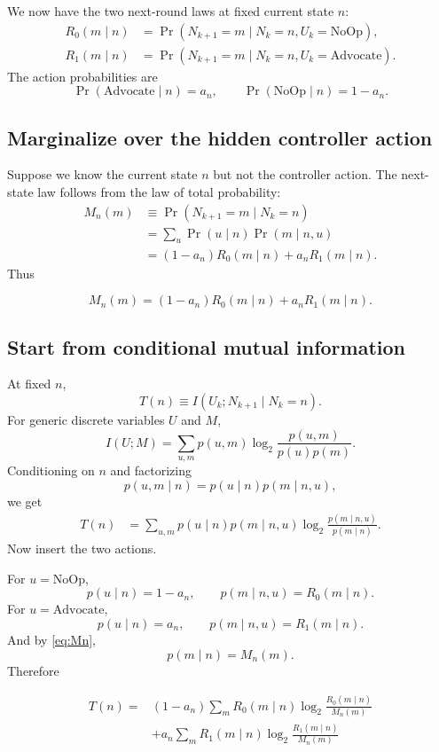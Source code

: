 \documentclass[11pt,a4paper]{article}
\newcommand{\Adv}{\ensuremath{\mathrm{Advocate}}}
\newcommand{\NoOp}{\ensuremath{\mathrm{NoOp}}}
\newcommand{\Prb}{\operatorname{Pr}}
\newcommand{\1}{\mathbbm{1}}
\begin{document}
We now have the two next-round laws at fixed current state $n$:
\begin{align}
R_0(m\mid n)
&=\Prb(N_{k+1}=m\mid N_k=n,U_k=\NoOp),\\
R_1(m\mid n)
&=\Prb(N_{k+1}=m\mid N_k=n,U_k=\Adv).
\end{align}
The action probabilities are
\[
\Prb(\Adv\mid n)=a_n,
\qquad
\Prb(\NoOp\mid n)=1-a_n.
\]

\subsection{Marginalize over the hidden controller action}

Suppose we know the current state $n$ but not the controller action. The next-state law follows from the law of total probability:
\begin{align}
M_n(m)
&\equiv \Prb(N_{k+1}=m\mid N_k=n)\\
&=\sum_u \Prb(u\mid n)\Prb(m\mid n,u)\\
&=(1-a_n)R_0(m\mid n)+a_nR_1(m\mid n).
\end{align}
Thus
\begin{resultbox}
\begin{equation}
\boxed{M_n(m)=(1-a_n)R_0(m\mid n)+a_nR_1(m\mid n).}
\label{eq:Mn}
\end{equation}
\end{resultbox}

\subsection{Start from conditional mutual information}

At fixed $n$,
\begin{equation}
T(n)
\equiv
I(U_k;N_{k+1}\mid N_k=n).
\label{eq:Tndef}
\end{equation}
For generic discrete variables $U$ and $M$,
\begin{equation}
I(U;M)=\sum_{u,m}p(u,m)\log_2\frac{p(u,m)}{p(u)p(m)}.
\end{equation}
Conditioning on $n$ and factorizing
\[
p(u,m\mid n)=p(u\mid n)p(m\mid n,u),
\]
we get
\begin{align}
T(n)
&=\sum_{u,m}p(u\mid n)p(m\mid n,u)
\log_2\frac{p(m\mid n,u)}{p(m\mid n)}.
\label{eq:TEfactorized}
\end{align}
Now insert the two actions.

For $u=\NoOp$,
\[
p(u\mid n)=1-a_n,
\qquad
p(m\mid n,u)=R_0(m\mid n).
\]
For $u=\Adv$,
\[
p(u\mid n)=a_n,
\qquad
p(m\mid n,u)=R_1(m\mid n).
\]
And by \cref{eq:Mn},
\[
p(m\mid n)=M_n(m).
\]
Therefore
\begin{resultbox}
\begin{equation}
\boxed{\begin{aligned}
T(n)
={}&(1-a_n)\sum_m R_0(m\mid n)
\log_2\frac{R_0(m\mid n)}{M_n(m)}\\
&+a_n\sum_m R_1(m\mid n)
\log_2\frac{R_1(m\mid n)}{M_n(m)}
\end{aligned}}
\label{eq:exactTE}
\end{equation}
\end{resultbox}
\end{document}
